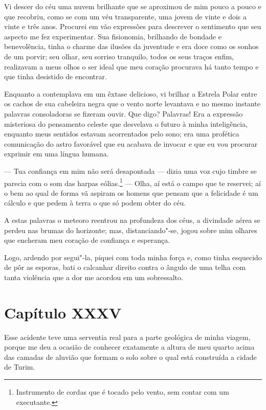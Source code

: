  Vi descer do céu uma nuvem brilhante que se aproximou de mim pouco a
pouco e que recobriu, como se com um véu transparente, uma jovem de
vinte e dois a vinte e três anos. Procurei em vão expressões para
descrever o sentimento que seu aspecto me fez experimentar. Sua
fisionomia, brilhando de bondade e benevolência, tinha o charme das
ilusões da juventude e era doce como os sonhos de um porvir; seu olhar,
seu sorriso tranquilo, todos os seus traços enfim, realizavam a meus olhos
o ser ideal que meu coração procurava há tanto tempo e que tinha
desistido de encontrar.

 Enquanto a contemplava em um êxtase delicioso, vi brilhar a Estrela
Polar entre os cachos de sua cabeleira negra que o vento norte
levantava e no mesmo instante palavras consoladoras se fizeram ouvir.
Que digo? Palavras! Era a expressão misteriosa do pensamento celeste
que desvelava o futuro à minha inteligência, enquanto meus sentidos
estavam acorrentados pelo sono; era uma profética comunicação do astro
favorável que eu acabava de invocar e que eu vou procurar exprimir em
uma língua humana.

 --- Tua confiança em mim não será desapontada --- dizia uma voz cujo
timbre se parecia com o som das harpas eólias.\footnote{ Instrumento de
cordas que é tocado pelo vento, sem contar com um executante.} --- Olha,
aí está o campo que te reservei; aí o bem ao qual de forma vã aspiram
os homens que pensam que a felicidade é um cálculo e que pedem à terra
o que só podem obter do céu.

 A estas palavras o meteoro reentrou na profundeza dos céus, a divindade
aérea se perdeu nas brumas do horizonte; mas, distanciando"-se, jogou
sobre mim olhares que encheram meu coração de confiança e esperança.

 Logo, ardendo por segui"-la, piquei com toda minha força e, como tinha
esquecido de pôr as esporas, bati o calcanhar direito contra o ângulo
de uma telha com tanta violência que a dor me acordou em um
sobressalto.

\section*{Capítulo XXXV}

 Esse acidente teve uma serventia real para a parte geológica de minha
viagem, porque me deu a ocasião de conhecer exatamente a altura de meu
quarto acima das camadas de aluvião que formam o solo sobre o qual está
construída a cidade de Turim.

